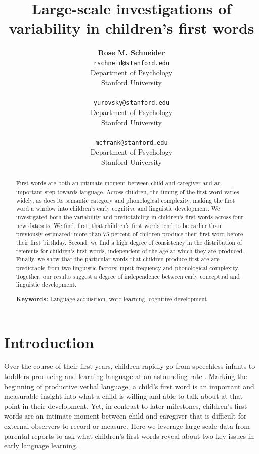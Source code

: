 \documentclass[10pt,letterpaper]{article}
\title{Large-scale investigations of variability in children's first words}
\author{{\large \bf Rose M. Schneider} \\ \texttt{rschneid@stanford.edu}\\ Department of Psychology \\ Stanford University \\ 
\And {\large \bf Daniel Yurovsky} \\ \texttt{yurovsky@stanford.edu} \\ Department of Psychology \\ Stanford University \\ 
\And {\large \bf Michael C. Frank} \\ \texttt{mcfrank@stanford.edu} \\ Department of Psychology \\ Stanford University \\ }
\begin{document}
\maketitle


\begin{abstract}
First words are both an intimate moment between child and caregiver and an important step towards language. Across children, the timing of the first word varies widely, as does its semantic category and phonological complexity, making the first word a window into children's early cognitive and linguistic development. We investigated both the variability and predictability in children's first words across four new datasets. We find, first, that children's first words tend to be earlier than previously estimated: more than 75 percent of children produce their first word before their first birthday. Second, we find a high degree of consistency in the distribution of referents for children's first words, independent of the age at which they are produced. Finally, we show that the particular words that children produce first are are predictable from two linguistic factors: input frequency and phonological complexity. Together, our results suggest a degree of independence between early conceptual and linguistic development.

\textbf{Keywords:}
Language acquisition, word learning, cognitive development
\end{abstract}

\section{Introduction}

Over the course of their first years, children rapidly go from speechless infants to toddlers producing and learning language at an astounding rate \cite{fenson1994}. Marking the beginning of productive verbal language, a child's first word is an important and measurable insight into what a child is willing and able to talk about at that point in their development. Yet, in contrast to later milestones, children's first words are an intimate moment between child and caregiver that is difficult for external observers to record or measure. Here we leverage large-scale data from parental reports to ask what children's first words reveal about two key issues in early language learning. 
\end{document}
